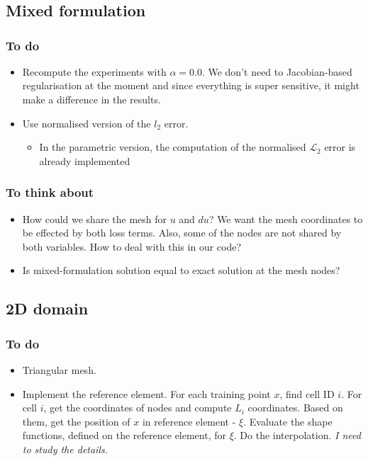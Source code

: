 \chapter[The 8$^{\text{th}}$ of March 2024]{}
\minitoc
\section{Mixed formulation}
\subsection{To do}
\begin{itemize}
    \item Recompute the experiments with $\alpha=0.0$. We don't need to Jacobian-based regularisation at the moment and since everything is super sensitive, it might make a difference in the results.
    \item Use normalised version of the $l_2$ error.
    \begin{itemize}
        \item In the parametric version, the computation of the normalised $\mathcal{L}_2$ error is already implemented
    \end{itemize}
\end{itemize}

\subsection{To think about}
\begin{itemize}
    \item How could we share the mesh for $u$ and $du$? We want the mesh coordinates to be effected by both loss terms. Also, some of the nodes are not shared by both variables. How to deal with this in our code?
    \item Is mixed-formulation solution equal to exact solution at the mesh nodes?
\end{itemize}

\section{2D domain }
\subsection{To do}
\begin{itemize}
    \item Triangular mesh. 
    \item Implement the reference element. For each training point $x$, find cell ID $i$. For cell $i$, get the coordinates of nodes and compute $L_i$ coordinates. Based on them, get the position of $x$ in reference element - $\xi$. Evaluate the shape functions, defined on the reference element, for $\xi$. Do the interpolation. \emph{I need to study the details. }
    
\end{itemize}

